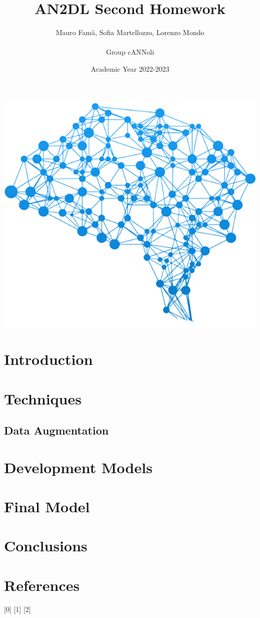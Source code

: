 \documentclass[11pt, oneside]{article}
\title{{\arial AN2DL Second Homework}}
\author{{\calibri Mauro Famà,   Sofia Martellozzo,   Lorenzo Mondo\\ \\
        Group cANNoli}}
\date{Academic Year 2022-2023}
\begin{document}
\maketitle
\begin{center}
    \includegraphics[scale=0.43]{images/title.png}
\end{center}
\newpage
\vspace{.25in}


\section{Introduction}

\section{Techniques}
\subsection{Data Augmentation}



\section{Development Models}

\section{Final Model}

\section{Conclusions}

\section*{References}
[0] 
{[1]} 
{[2]}
\end{document}
